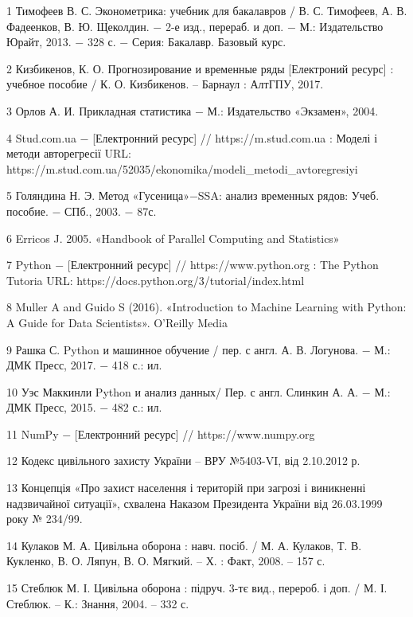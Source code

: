
\hspace*{26pt} 1 Тимофеев В. С. Эконометрика: учебник для бакалавров / В. С. Тимофеев, А. В. Фадеенков, В. Ю. Щеколдин. $-$ 2-е изд., перераб. и доп. $-$ М.: Издательство Юрайт, 2013. $-$ 328 с. $-$ Серия: Бакалавр. Базовый курс.

2 Кизбикенов, К. О. Прогнозирование и временные ряды [Електроний ресурс] : учебное пособие / К. О. Кизбикенов. $–$ Барнаул : АлтГПУ, 2017.

3 Орлов А. И. Прикладная статистика $-$ М.: Издательство «Экзамен», 2004.

4 Stud.com.ua $-$ [Електронний ресурс] // https://m.stud.com.ua : Моделі і методи авторегресії URL: https://m.stud.com.ua/52035/ekonomika/modeli\_metodi\_avtoregresiyi

5 Голяндина Н. Э. Метод «Гусеница»$-$SSA: анализ временных рядов: Учеб. пособие. $-$ СПб., 2003. $-$ 87с.

6 Erricos J. 2005. «Handbook of Parallel Computing and Statistics»

7 Python $-$ [Електронний ресурс] // https://www.python.org :  The Python Tutoria URL: https://docs.python.org/3/tutorial/index.html

8 Muller A and Guido S (2016). «Introduction to Machine Learning with Python: A Guide for Data Scientists». O'Reilly Media

9 Рашка С. Python и машинное обучение / пер. с англ. А. В. Логунова. $-$ М.: ДМК Пресс, 2017. $-$ 418 с.: ил.

10 Уэс Маккинли Python и анализ данных/ Пер. с англ. Слинкин А. А. $-$ М.: ДМК Пресс, 2015. $-$ 482 с.: ил. 

11 NumPy $-$ [Електронний ресурс] // https://www.numpy.org

12 Кодекс цивільного захисту України – ВРУ №5403-VI, від 2.10.2012 р.

13 Концепція «Про захист населення і територій при загрозі і виникненні надзвичайної ситуації», схвалена Наказом Президента України від 26.03.1999 року № 234/99.

14 Кулаков М. А. Цивільна оборона : навч. посіб. / М. А. Кулаков, Т. В. Кукленко, В. О. Ляпун, В. О. Мягкий. – Х. : Факт, 2008. – 157 с.

15 Стеблюк М. І. Цивільна оборона  : підруч. 3-тє вид., перероб. і доп. / М. І. Стеблюк. – К.: Знання, 2004. – 332 с.
